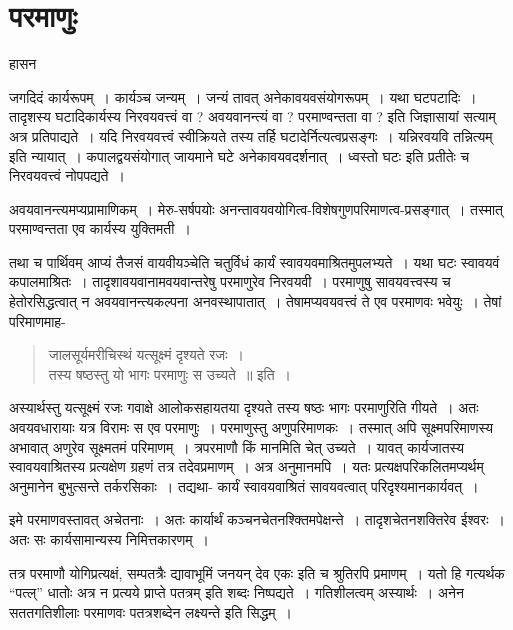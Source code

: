 {\fontsize{15}{17}\selectfont
\presetvalues
\chapter{परमाणुः}

\begin{center}
\smallskip
हासन
\addrule
\end{center}
जगदिदं कार्यरूपम्~। कार्यञ्च जन्यम्~। जन्यं तावत् अनेकावयवसंयोगरूपम्~। यथा घटपटादिः~। तादृशस्य घटादिकार्यस्य निरवयवत्त्वं वा ? अवयवानन्त्यं वा ? परमाण्वन्तता वा ? इति जिज्ञासायां सत्याम् अत्र प्रतिपाद्यते~। यदि निरवयवत्त्वं स्वीक्रियते तस्य तर्हि घटादेर्नित्यत्वप्रसङ्गः~। यन्निरवयवि तन्नित्यम् इति न्यायात्~। कपालद्वयसंयोगात् जायमाने घटे अनेकावयवदर्शनात्~। ध्वस्तो घटः इति प्रतीतेः च निरवयवत्त्वं नोपपद्यते~। 

अवयवानन्त्यमप्यप्रामाणिकम्~। मेरु-सर्षपयोः अनन्तावयवयोगित्व-विशेषगुणपरि\-माणत्व-प्रसङ्गात्~। तस्मात् परमाण्वन्तता एव कार्यस्य युक्तिमती~। 

तथा च पार्थिवम् आप्यं तैजसं वायवीयञ्चेति चतुर्विधं कार्यं स्वावयवमाश्रितमुपलभ्यते~। यथा घटः स्वावयवं कपालमाश्रितः~। तादृशावयवानामवयवान्तरेषु परमाणुरेव निरवयवी~। परमाणुषु सावयवत्त्वस्य च हेतोरसिद्धत्वात् न अवयवानन्त्यकल्पना अनवस्थापातात्~। तेषामप्यवयवत्त्वं ते एव परमाणवः भवेयुः~। तेषां परिमाणमाह-
\begin{verse}
जालसूर्यमरीचिस्थं यत्सूक्ष्मं दृश्यते रजः~। \\
तस्य षष्ठस्तु यो भागः परमाणुः स उच्यते~॥ इति~। 
\end{verse}
अस्यार्थस्तु यत्सूक्ष्मं रजः गवाक्षे आलोकसहायतया दृश्यते तस्य षष्ठः भागः परमाणुरिति गीयते~। अतः अवयवधारायाः यत्र विरामः स एव परमाणुः~। परमाणुस्तु अणुपरिमाणकः~। तस्मात् अपि सूक्ष्मपरिमाणस्य अभावात् अणुरेव सूक्ष्मतमं परिमाणम्~। त्रपरमाणौ किं मानमिति चेत् उच्यते~। यावत् कार्यजातस्य स्वावयवाश्रितस्य प्रत्यक्षेण ग्रहणं तत्र तदेवप्रमाणम्~। अत्र अनुमानमपि~। यतः प्रत्यक्षपरिकलितमप्यर्थम् अनुमानेन बुभुत्सन्ते तर्करसिकाः~। तद्यथा- कार्यं स्वावयवाश्रितं सावयवत्वात् परिदृश्यमानकार्यवत्~। 

इमे परमाणवस्तावत् अचेतनाः~। अतः कार्यार्थं कञ्चनचेतनश्क्तिमपेक्षन्ते~। तादृशचेतनशक्तिरेव ईश्वरः~। अतः सः कार्यसामान्यस्य निमित्तकारणम्~। 

तत्र परमाणौ योगिप्रत्यक्षं, सम्पतत्रैः द्यावाभूमिं जनयन् देव एकः इति च श्रुतिरपि प्रमाणम्~। यतो हि गत्यर्थक “पत्ल्” धातोः अत्र न प्रत्यये प्राप्ते पतत्रम् इति शब्दः निष्पद्यते~। गतिशीलत्वम् अस्यार्थः~। अनेन सततगतिशीलाः परमाणवः पतत्रशब्देन लक्ष्यन्ते इति सिद्धम्~। 

}
